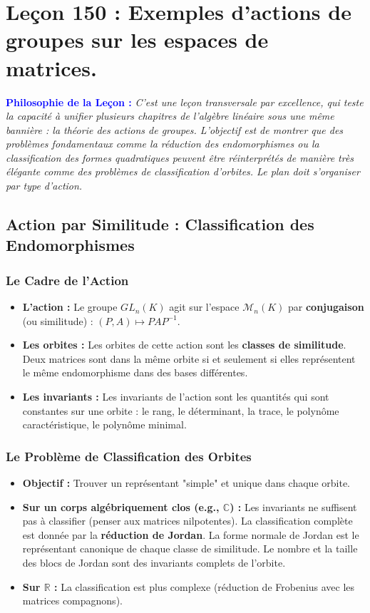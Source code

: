 \documentclass[12pt, a4paper, parskip=full]{report}
\theoremstyle{agregstyle}
\newenvironment{philosophie}
  {\par\medskip\noindent\begin{oframed}\noindent\textbf{\textcolor{blue}{Philosophie de la Leçon :}}\itshape}
  {\end{oframed}\par\medskip}
\begin{document}
\newpage

\chapter{Leçon 150 : Exemples d'actions de groupes sur les espaces de matrices.}

\begin{philosophie}
    C'est une leçon transversale par excellence, qui teste la capacité à unifier plusieurs chapitres de l'algèbre linéaire sous une même bannière : la théorie des actions de groupes. L'objectif est de montrer que des problèmes fondamentaux comme la réduction des endomorphismes ou la classification des formes quadratiques peuvent être réinterprétés de manière très élégante comme des problèmes de classification d'orbites. Le plan doit s'organiser par type d'action.
\end{philosophie}

\section{Action par Similitude : Classification des Endomorphismes}

\subsection{Le Cadre de l'Action}
\begin{itemize}
    \item \textbf{L'action :} Le groupe $GL_n(K)$ agit sur l'espace $\mathcal{M}_n(K)$ par \textbf{conjugaison} (ou similitude) : $(P,A) \mapsto PAP^{-1}$.
    \item \textbf{Les orbites :} Les orbites de cette action sont les \textbf{classes de similitude}. Deux matrices sont dans la même orbite si et seulement si elles représentent le même endomorphisme dans des bases différentes.
    \item \textbf{Les invariants :} Les invariants de l'action sont les quantités qui sont constantes sur une orbite : le rang, le déterminant, la trace, le polynôme caractéristique, le polynôme minimal.
\end{itemize}

\subsection{Le Problème de Classification des Orbites}
\begin{itemize}
    \item \textbf{Objectif :} Trouver un représentant "simple" et unique dans chaque orbite.
    \item \textbf{Sur un corps algébriquement clos (e.g., $\mathbb{C}$) :} Les invariants ne suffisent pas à classifier (penser aux matrices nilpotentes). La classification complète est donnée par la \textbf{réduction de Jordan}. La forme normale de Jordan est le représentant canonique de chaque classe de similitude. Le nombre et la taille des blocs de Jordan sont des invariants complets de l'orbite.
    \item \textbf{Sur $\mathbb{R}$ :} La classification est plus complexe (réduction de Frobenius avec les matrices compagnons).
\end{itemize}
\end{document}
